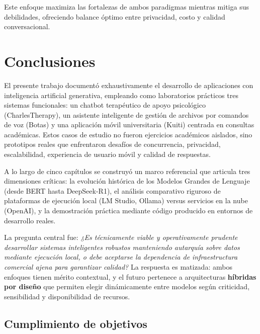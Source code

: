 \documentclass[12pt,a4paper]{report}
\numberwithin{figure}{section}
\begin{document}
Este enfoque maximiza las fortalezas de ambos paradigmas mientras mitiga sus debilidades, ofreciendo balance óptimo entre privacidad, costo y calidad conversacional.



\chapter{Conclusiones}
\label{ch:conclusiones}

El presente trabajo documentó exhaustivamente el desarrollo de aplicaciones con inteligencia artificial generativa, empleando como laboratorios prácticos tres sistemas funcionales: un chatbot terapéutico de apoyo psicológico (CharlesTherapy), un asistente inteligente de gestión de archivos por comandos de voz (Botas) y una aplicación móvil universitaria (Kuiti) centrada en consultas académicas. Estos casos de estudio no fueron ejercicios académicos aislados, sino prototipos reales que enfrentaron desafíos de concurrencia, privacidad, escalabilidad, experiencia de usuario móvil y calidad de respuestas.

A lo largo de cinco capítulos se construyó un marco referencial que articula tres dimensiones críticas: la evolución histórica de los Modelos Grandes de Lenguaje (desde BERT hasta DeepSeek-R1), el análisis comparativo riguroso de plataformas de ejecución local (LM Studio, Ollama) versus servicios en la nube (OpenAI), y la demostración práctica mediante código producido en entornos de desarrollo reales.

La pregunta central fue: \textit{¿Es técnicamente viable y operativamente prudente desarrollar sistemas inteligentes robustos manteniendo autarquía sobre datos mediante ejecución local, o debe aceptarse la dependencia de infraestructura comercial ajena para garantizar calidad?} La respuesta es matizada: ambos enfoques tienen mérito contextual, y el futuro pertenece a arquitecturas \textbf{híbridas por diseño} que permiten elegir dinámicamente entre modelos según criticidad, sensibilidad y disponibilidad de recursos.

\vspace{1em}

\section{Cumplimiento de objetivos}
\label{sec:cumplimiento_objetivos}
\end{document}
